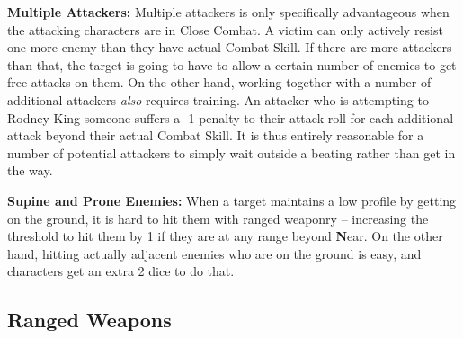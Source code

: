 \textbf{Multiple Attackers:} Multiple attackers is only specifically advantageous when the attacking characters are in Close Combat. A victim can only actively resist one more enemy than they have actual Combat Skill. If there are more attackers than that, the target is going to have to allow a certain number of enemies to get free attacks on them. On the other hand, working together with a number of additional attackers \textit{also} requires training. An attacker who is attempting to Rodney King someone suffers a -1 penalty to their attack roll for each additional attack beyond their actual Combat Skill. It is thus entirely reasonable for a number of potential attackers to simply wait outside a beating rather than get in the way.

\textbf{Supine and Prone Enemies:} When a target maintains a low profile by getting on the ground, it is hard to hit them with ranged weaponry -- increasing the threshold to hit them by 1 if they are at any range beyond \textbf{N}ear. On the other hand, hitting actually adjacent enemies who are on the ground is easy, and characters get an extra 2 dice to do that.

\subsection{Ranged Weapons} 

